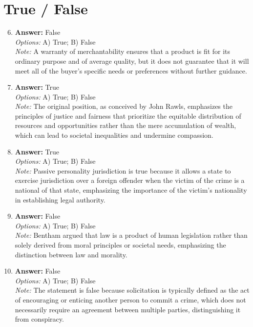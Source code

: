 \documentclass[12pt]{article}
\begin{document}
\section*{True / False}
\begin{enumerate}[label=\arabic*.]
\setcounter{enumi}{5}
\item \textbf{Answer:} False
\\ \textit{Options:} A) True; B) False
\\ \textit{Note:} A warranty of merchantability ensures that a product is fit for its ordinary purpose and of average quality, but it does not guarantee that it will meet all of the buyer's specific needs or preferences without further guidance.
\item \textbf{Answer:} True
\\ \textit{Options:} A) True; B) False
\\ \textit{Note:} The original position, as conceived by John Rawls, emphasizes the principles of justice and fairness that prioritize the equitable distribution of resources and opportunities rather than the mere accumulation of wealth, which can lead to societal inequalities and undermine compassion.
\item \textbf{Answer:} True
\\ \textit{Options:} A) True; B) False
\\ \textit{Note:} Passive personality jurisdiction is true because it allows a state to exercise jurisdiction over a foreign offender when the victim of the crime is a national of that state, emphasizing the importance of the victim's nationality in establishing legal authority.
\item \textbf{Answer:} False
\\ \textit{Options:} A) True; B) False
\\ \textit{Note:} Bentham argued that law is a product of human legislation rather than solely derived from moral principles or societal needs, emphasizing the distinction between law and morality.
\item \textbf{Answer:} False
\\ \textit{Options:} A) True; B) False
\\ \textit{Note:} The statement is false because solicitation is typically defined as the act of encouraging or enticing another person to commit a crime, which does not necessarily require an agreement between multiple parties, distinguishing it from conspiracy.
\end{enumerate}
\end{document}
